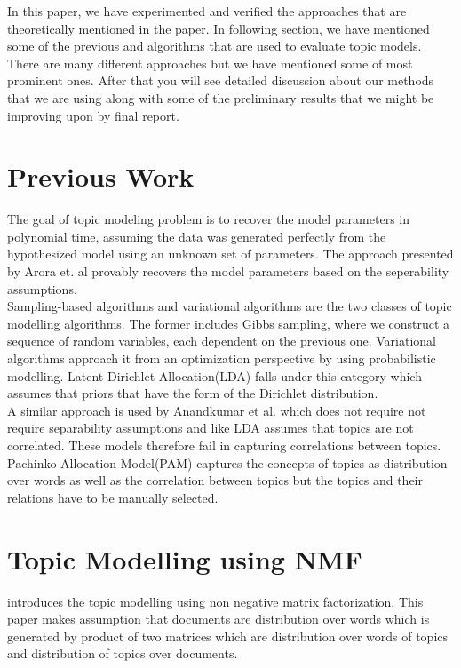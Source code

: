 \documentclass[a4paper,11pt]{article}
\begin{document}
In this paper, we have experimented and verified the approaches that are theoretically mentioned in the paper. In following section, we have mentioned some of the previous and algorithms that are used to evaluate topic models. There are many different approaches but we have mentioned some of most prominent ones. After that you will see detailed discussion about our methods that we are using along with some of the preliminary results that we might be improving upon by final report. \\

\section{Previous Work}

The goal of topic modeling problem is to recover the model parameters in polynomial time, assuming the data was generated perfectly from the hypothesized model using an unknown set of parameters. The approach presented by Arora et. al\cite{tm} provably recovers the model parameters based on the seperability assumptions. \\

Sampling-based algorithms and variational algorithms are the two classes of topic modelling algorithms. The former includes Gibbs sampling, where we construct a sequence of random variables, each dependent on the previous one. Variational algorithms approach it from an optimization perspective by using probabilistic modelling\cite{blei}. Latent Dirichlet Allocation(LDA) falls under this category which assumes that priors that have the form of the Dirichlet distribution.\\ 

A similar approach is used by Anandkumar et al\cite{anand12}. which does not require not require separability assumptions and like LDA assumes that topics are not correlated. These models therefore fail in capturing correlations between topics. Pachinko Allocation Model(PAM) captures the concepts of topics as distribution over words as well as the correlation between topics but the topics and their relations have to be manually selected\cite{pam}.



\section{Topic Modelling using NMF}
\cite{tm} introduces the topic modelling using non negative matrix factorization. This paper makes assumption that documents are distribution over words which is generated by product of two matrices which are distribution over words of topics and distribution of topics over documents.\\
\end{document}
